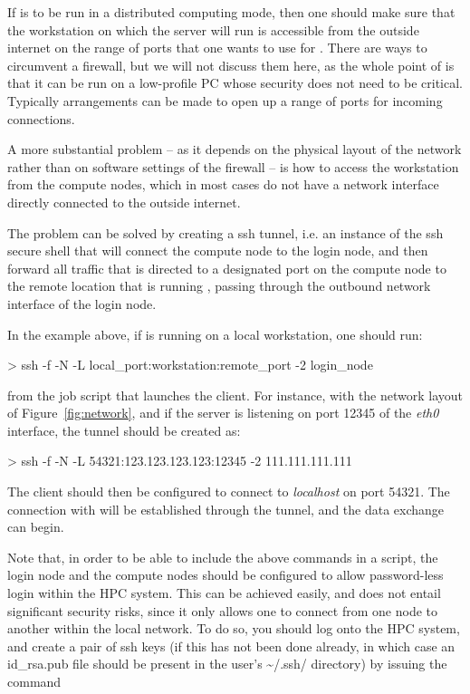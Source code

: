 \documentclass[11pt,english,fleqn]{report}
\newenvironment{code}{%
\footnotesize
\verbatim
}{
\endverbatim
\normalsize
}
\begin{document}
\label{ssh_sockets}

If \ipi is to be run in a distributed computing mode, then one should
make sure that the workstation on which the server will run is accessible from
the outside internet on the range of ports that one wants to use for
\ipi. There are ways to circumvent a firewall, but we will not discuss them
here, as the whole point of \ipi is that it can be run on a low-profile
PC whose security does not need to be critical. Typically arrangements
can be made to open up a range of ports for incoming connections.

A more substantial problem -- as it depends on the physical layout
of the network rather than on software settings of the firewall --
is how to access the workstation from the compute nodes, which in most
cases do not have a network interface directly connected to the
outside internet.

The problem can be solved by creating a ssh tunnel, i.e. an instance of
the ssh secure shell that will connect the compute node to the login node,
and then forward all traffic that is directed to a designated port
on the compute node to the remote location that is running \ipi, passing
through the outbound network interface of the login node.

In the example above, if \ipi{} is running on a local workstation, one should run:

\begin{code}
> ssh -f -N -L local_port:workstation:remote_port -2 login_node
\end{code}

\noindent from the job script that launches the client.
For instance, with the network layout of Figure~\ref{fig:network},
and if the \ipi{} server is listening
on port 12345 of the \emph{eth0} interface, the tunnel should be created as:

\begin{code}
> ssh -f -N -L 54321:123.123.123.123:12345 -2 111.111.111.111
\end{code}

\noindent The client should then be configured to connect to \emph{localhost}
on port 54321. The connection with \ipi will be established through the tunnel,
and the data exchange can begin.

Note that, in order to be able to include the above commands in a script,
the login node and the compute nodes should be configured to allow
password-less login within the HPC system. This can be achieved easily, and
does not entail significant security risks, since it only allows one to
connect from one node to another within the local network.
To do so, you should log onto the HPC system, and create a pair
of ssh keys (if this has not been done already, in which case an
id\_rsa.pub file should be present in the user's \textasciitilde{}/.ssh/ directory)
by issuing the command
\end{document}
